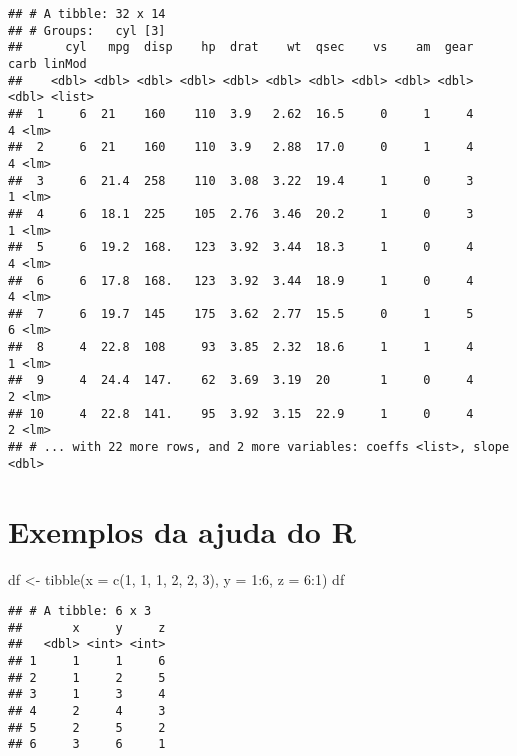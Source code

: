\documentclass[
]{book}
\newenvironment{Shaded}{\begin{snugshade}}{\end{snugshade}}
\newcommand{\AttributeTok}[1]{\textcolor[rgb]{0.77,0.63,0.00}{#1}}
\newcommand{\DecValTok}[1]{\textcolor[rgb]{0.00,0.00,0.81}{#1}}
\newcommand{\FunctionTok}[1]{\textcolor[rgb]{0.00,0.00,0.00}{#1}}
\newcommand{\NormalTok}[1]{#1}
\newcommand{\OtherTok}[1]{\textcolor[rgb]{0.56,0.35,0.01}{#1}}
\newcommand{\SpecialCharTok}[1]{\textcolor[rgb]{0.00,0.00,0.00}{#1}}
\begin{document}
\begin{verbatim}
## # A tibble: 32 x 14
## # Groups:   cyl [3]
##      cyl   mpg  disp    hp  drat    wt  qsec    vs    am  gear  carb linMod
##    <dbl> <dbl> <dbl> <dbl> <dbl> <dbl> <dbl> <dbl> <dbl> <dbl> <dbl> <list>
##  1     6  21    160    110  3.9   2.62  16.5     0     1     4     4 <lm>  
##  2     6  21    160    110  3.9   2.88  17.0     0     1     4     4 <lm>  
##  3     6  21.4  258    110  3.08  3.22  19.4     1     0     3     1 <lm>  
##  4     6  18.1  225    105  2.76  3.46  20.2     1     0     3     1 <lm>  
##  5     6  19.2  168.   123  3.92  3.44  18.3     1     0     4     4 <lm>  
##  6     6  17.8  168.   123  3.92  3.44  18.9     1     0     4     4 <lm>  
##  7     6  19.7  145    175  3.62  2.77  15.5     0     1     5     6 <lm>  
##  8     4  22.8  108     93  3.85  2.32  18.6     1     1     4     1 <lm>  
##  9     4  24.4  147.    62  3.69  3.19  20       1     0     4     2 <lm>  
## 10     4  22.8  141.    95  3.92  3.15  22.9     1     0     4     2 <lm>  
## # ... with 22 more rows, and 2 more variables: coeffs <list>, slope <dbl>
\end{verbatim}

\hypertarget{exemplos-da-ajuda-do-r}{%
\section{Exemplos da ajuda do R}\label{exemplos-da-ajuda-do-r}}

\begin{Shaded}
\begin{Highlighting}[]
\NormalTok{df }\OtherTok{\textless{}{-}} \FunctionTok{tibble}\NormalTok{(}\AttributeTok{x =} \FunctionTok{c}\NormalTok{(}\DecValTok{1}\NormalTok{, }\DecValTok{1}\NormalTok{, }\DecValTok{1}\NormalTok{, }\DecValTok{2}\NormalTok{, }\DecValTok{2}\NormalTok{, }\DecValTok{3}\NormalTok{), }
             \AttributeTok{y =} \DecValTok{1}\SpecialCharTok{:}\DecValTok{6}\NormalTok{, }
             \AttributeTok{z =} \DecValTok{6}\SpecialCharTok{:}\DecValTok{1}\NormalTok{)}
\NormalTok{df}
\end{Highlighting}
\end{Shaded}

\begin{verbatim}
## # A tibble: 6 x 3
##       x     y     z
##   <dbl> <int> <int>
## 1     1     1     6
## 2     1     2     5
## 3     1     3     4
## 4     2     4     3
## 5     2     5     2
## 6     3     6     1
\end{verbatim}
\end{document}
